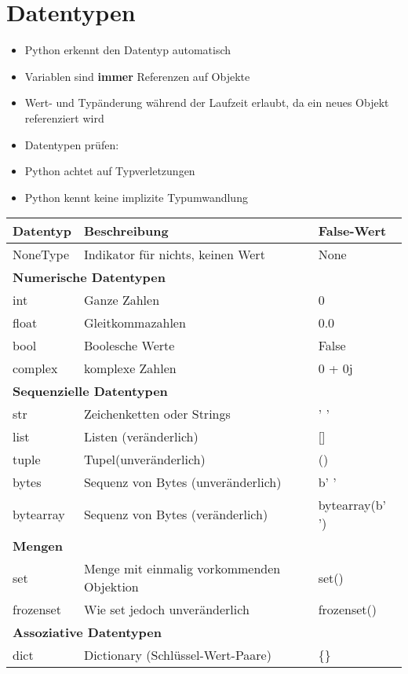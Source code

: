 \section{Datentypen}

\begin{itemize}
\item Python erkennt den Datentyp automatisch
\item Variablen sind \textbf{immer} Referenzen auf Objekte
	
\item Wert- und Typänderung während der Laufzeit erlaubt, da ein neues Objekt referenziert wird
\item Datentypen prüfen:
	
\item Python achtet auf Typverletzungen
\item Python kennt keine implizite Typumwandlung
\end{itemize}

\begin{tabular}{ lll }
	\hline
	\textbf{Datentyp} & \textbf{Beschreibung} & \textbf{False-Wert}\\
	\hline
	NoneType & Indikator für nichts, keinen Wert & None \\
	\hline
	\multicolumn{3}{l}{\textbf{Numerische Datentypen}}\\
	int&Ganze Zahlen & 0\\
	float&Gleitkommazahlen&0.0\\
	bool&Boolesche Werte&False\\
	complex&komplexe Zahlen& 0 + 0j\\
	\hline
	\multicolumn{3}{l}{\textbf{Sequenzielle Datentypen}}\\
	str&Zeichenketten oder Strings&' '\\
	list&Listen (veränderlich)&[]\\
	tuple&Tupel(unveränderlich)&()\\
	bytes&Sequenz von Bytes (unveränderlich)&b' '\\
	bytearray&Sequenz von Bytes (veränderlich)&bytearray(b' ')\\
   \hline
   \multicolumn{3}{l}{\textbf{Mengen}}\\
   set&Menge mit einmalig vorkommenden Objektion&set()\\
   frozenset& Wie set jedoch unveränderlich&frozenset()\\
   \hline
   \multicolumn{3}{l}{\textbf{Assoziative Datentypen}}\\
   dict&Dictionary (Schlüssel-Wert-Paare)&\{\}\\
   \hline
\end{tabular}

